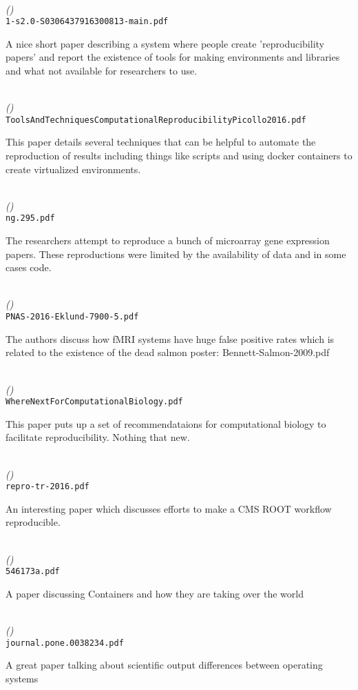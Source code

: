 \documentclass[american]{article}
\newenvironment{refdef}[2] {
	\noindent \textbf{\citetitle{#1}} \cite{#1}\\ \citejournalorbooktitle{#1} \textit{(\citeyear{#1})}\\ \texttt{#2} \vspace{0.2in} \par 
} {
\vspace{0.2in}
}
\begin{document}
\begin{refdef}{collaborative-reproducibility}{1-s2.0-S0306437916300813-main.pdf}
A nice short paper describing a system where people create 'reproducibility papers' and report the existence of tools for making environments and libraries and what not available for researchers to use.
\end{refdef}

\begin{refdef}{tools-and-techniques-computational-reproducibility}{ToolsAndTechniquesComputationalReproducibilityPicollo2016.pdf}
This paper details several techniques that can be helpful to automate the reproduction of results including things like scripts and using docker containers to create virtualized environments.
\end{refdef}

\begin{refdef}{Ioannidis2009}{ng.295.pdf}
The researchers attempt to reproduce a bunch of microarray gene expression papers. These reproductions were limited by the availability of data and in some cases code.
\end{refdef}

\begin{refdef}{fmri-false-positives}{PNAS-2016-Eklund-7900-5.pdf}
The authors discuss how fMRI systems have huge false positive rates which is related to the existence of the dead salmon poster: Bennett-Salmon-2009.pdf
\end{refdef}

\begin{refdef}{reproducibility-computational-biology}{WhereNextForComputationalBiology.pdf}
This paper puts up a set of recommendataions for computational biology to facilitate reproducibility. Nothing that new.
\end{refdef}

\begin{refdef}{Thain-CMS-Repro}{repro-tr-2016.pdf}
An interesting paper which discusses efforts to make a CMS ROOT workflow reproducible.
\end{refdef}

\begin{refdef}{ContainersNature}{546173a.pdf}
A paper discussing Containers and how they are taking over the world
\end{refdef}

\begin{refdef}{10.1371/journal.pone.0038234}{journal.pone.0038234.pdf}
A great paper talking about scientific output differences between operating systems
\end{refdef}
\end{document}
